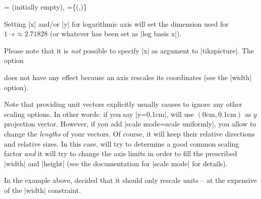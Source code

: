 \begin{pgfplotsxykeylist}{%
    \x= (initially empty),
    \x={\{(,)\}}%
}
\begin{codeexample}[]
\end{codeexample}

\begin{codeexample}[]
\end{codeexample}

    Setting |x| and/or |y| for logarithmic axis will set the dimension used for
    $1 \cdot e \approx 2.71828$ (or whatever has been set as |log basis x|).

    Please note that it is \emph{not} possible to specify |x| as argument to
    |tikzpicture|. The option
\begin{codeexample}
\end{codeexample}
    does not have any effect because an axis rescales its coordinates (see the
    |width| option).

    Note that providing unit vectors explicitly usually causes \PGFPlots{} to
    ignore any other scaling options. In other words: if you say |y=0.1cm|,
    \PGFPlots{} will use $(0\text{cm},0.1\text{cm})$ as $y$ projection vector.
    However, if you add |scale mode=scale uniformly|, you allow \PGFPlots{} to
    change the \emph{lengths} of your vectors. Of course, it will keep their
    relative directions and relative sizes. In this case, \PGFPlots{} will try
    to determine a good common scaling factor \emph{and} it will try to change
    the axis limits in order to fill the prescribed |width| and |height| (see
    the documentation for |scale mode| for details).
\begin{codeexample}[]
\end{codeexample}
    \noindent In the example above, \PGFPlots{} decided that it should only
    rescale units -- at the expensive of the |width| constraint.



\end{pgfplotsxykeylist}
